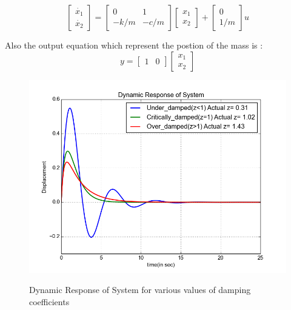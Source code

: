 \documentclass[a4paper,12pt,twocolumn]{article}
\newcommand*{\MyPath}{../latex-files}%
\begin{document}
\[
\begin{bmatrix} 
	\dot{x_1}\\ \dot{x_2} 
\end{bmatrix} = 
\begin{bmatrix} 
	0 & 1 \\ 
	- k/m &-c/m 
\end{bmatrix} 
\begin{bmatrix} 
	x_1\\x_2 
\end{bmatrix} + 
\begin{bmatrix} 
	0\\
	1/m 
\end{bmatrix} u  
\]
  
Also the output equation which represent the postion of the mass is :
\[
	y = 
	\begin{bmatrix} 
		{1}&{0} 
	\end{bmatrix} 
	\begin{bmatrix} 
		{x_1}\\ {x_2} 
	\end{bmatrix}   
\]

 
  
  
\begin{figure}
\centering
\includegraphics[scale = 0.5]{Response}
\label{fig:Response}
\caption{Dynamic Response of System for various values of damping coefficients}
\end{figure}




\end{document}
